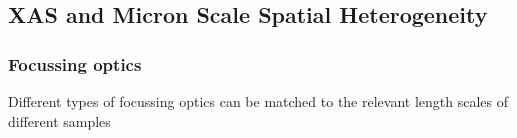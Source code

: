 \documentclass[10pt, xcolor=x11names, compress, handout]{beamer}
\begin{document}



\subsection[Microprobe]{XAS and Micron Scale Spatial Heterogeneity}


\begin{frame}
  \frametitle{Focussing optics}

  Different types of focussing optics can be matched to the relevant
  length scales of different samples


\end{frame}
\end{document}

